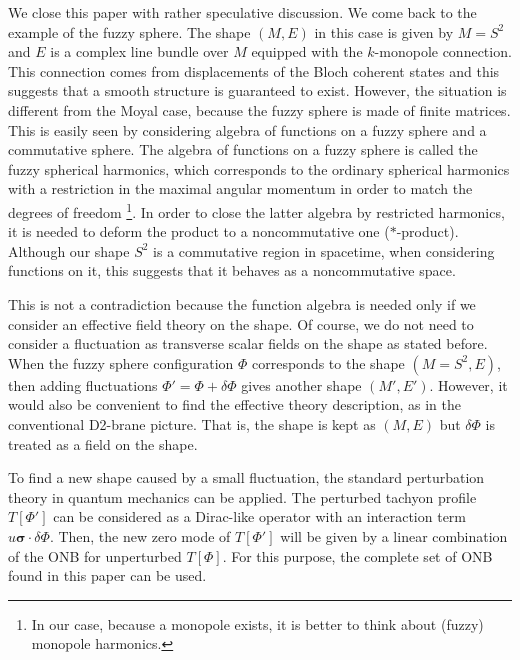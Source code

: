 \documentclass[12pt]{article}
\numberwithin{equation}{section}
\begin{document}
We close this paper with rather speculative discussion.
We come back to the example of the fuzzy sphere.
The shape $(M,E)$ in this case is given by $M=S^2$ and $E$ is a complex line 
bundle over $M$ equipped with the $k$-monopole connection.
This connection comes from displacements of the Bloch coherent states 
and this suggests that a smooth structure is guaranteed to exist.
However, the situation is different from the Moyal case, 
because the fuzzy sphere is made of finite matrices.
This is easily seen by considering algebra of functions on a fuzzy sphere and 
a commutative sphere.
The algebra of functions on a fuzzy sphere is called the fuzzy spherical harmonics,
{which} corresponds to the ordinary spherical harmonics with 
{a} restriction {in} the maximal 
angular momentum in order to match the degrees of freedom%
\footnote{In our case, because a monopole exists, it is better to think about (fuzzy) 
monopole harmonics.}.
In order to close the latter algebra by restricted harmonics, it is needed to deform 
the product to a noncommutative one ($*$-product).
Although our shape $S^2$ is a commutative region in spacetime, 
when considering functions on it, 
this suggests that it behaves as a noncommutative space.


This is not a contradiction because the function algebra is needed 
only if we consider an effective field theory on the shape.
Of course, we do not need to consider a fluctuation 
as transverse scalar fields on the shape as stated before.
When the fuzzy sphere configuration $\Phi$ corresponds to the shape $(M=S^2,E)$,
then adding fluctuations $\Phi'=\Phi+\delta\Phi$ gives another shape $(M',E')$.
However, it would also be convenient to find the effective theory description,
as in the conventional D2-brane picture.
That is, the shape is kept as $(M,E)$ but $\delta\Phi$ is treated as a field on the shape.

To find a new shape caused by a small fluctuation, 
the standard perturbation theory in quantum mechanics can be applied. 
The perturbed tachyon profile $T[\Phi']$ can be considered as a Dirac-like operator with an interaction term $u\boldsymbol{\sigma}\cdot\delta\Phi$. 
Then, the new zero mode of $T[\Phi']$ will be given by 
a linear combination of the ONB for unperturbed $T[\Phi]$. 
For this purpose, the complete set of ONB found in this paper can be used. 
\end{document}
